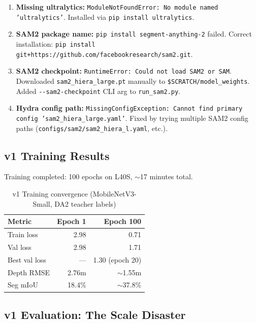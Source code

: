 \documentclass[11pt,a4paper]{article}
\begin{document}
\begin{enumerate}[nosep]
  \item \textbf{Missing ultralytics:} \texttt{ModuleNotFoundError: No module named 'ultralytics'}. Installed via \texttt{pip install ultralytics}.

  \item \textbf{SAM2 package name:} \texttt{pip install segment-anything-2} failed. Correct installation: \texttt{pip install git+https://github.com/facebookresearch/sam2.git}.

  \item \textbf{SAM2 checkpoint:} \texttt{RuntimeError: Could not load SAM2 or SAM}. Downloaded \texttt{sam2\_hiera\_large.pt} manually to \texttt{\$SCRATCH/model\_weights}. Added \texttt{-{}-sam2-checkpoint} CLI arg to \texttt{run\_sam2.py}.

  \item \textbf{Hydra config path:} \texttt{MissingConfigException: Cannot find primary config 'sam2\_hiera\_large.yaml'}. Fixed by trying multiple SAM2 config paths (\texttt{configs/sam2/sam2\_hiera\_l.yaml}, etc.).
\end{enumerate}

\subsection{v1 Training Results}

Training completed: 100 epochs on L40S, $\sim$17 minutes total.

\begin{table}[h]
\centering
\caption{v1 Training convergence (MobileNetV3-Small, DA2 teacher labels)}
\label{tab:v1-training}
\begin{tabular}{lrr}
\toprule
\textbf{Metric} & \textbf{Epoch 1} & \textbf{Epoch 100} \\
\midrule
Train loss     & 2.98  & 0.71  \\
Val loss       & 2.98  & 1.71  \\
Best val loss  & ---   & 1.30 (epoch 20) \\
Depth RMSE     & 2.76m & $\sim$1.55m \\
Seg mIoU       & 18.4\% & $\sim$37.8\% \\
\bottomrule
\end{tabular}
\end{table}

\subsection{v1 Evaluation: The Scale Disaster}
\label{sec:v1-eval}
\end{document}
